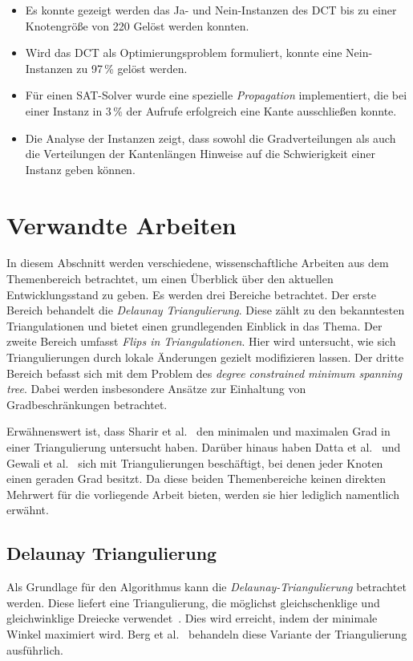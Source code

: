 \begin{itemize}
    \item Es konnte gezeigt werden das Ja- und Nein-Instanzen des DCT bis zu einer Knotengröße von 220 Gelöst werden konnten.
    \item Wird das DCT als Optimierungsproblem formuliert, konnte eine  Nein-Instanzen zu 97\,\% gelöst werden.
    \item Für einen SAT-Solver wurde eine spezielle \emph{Propagation} implementiert, die bei einer Instanz in 3\,\% der Aufrufe erfolgreich eine Kante ausschließen konnte.
    \item Die Analyse der Instanzen zeigt, dass sowohl die Gradverteilungen als auch die Verteilungen der Kantenlängen Hinweise auf die Schwierigkeit einer Instanz geben können.
\end{itemize}


\section{Verwandte Arbeiten}

In diesem Abschnitt werden verschiedene, wissenschaftliche Arbeiten aus dem Themenbereich betrachtet, um einen Überblick über den aktuellen Entwicklungsstand zu geben.
Es werden drei Bereiche betrachtet.
Der erste Bereich behandelt die \emph{Delaunay Triangulierung}.
Diese zählt zu den bekanntesten Triangulationen und bietet einen grundlegenden Einblick in das Thema.
Der zweite Bereich umfasst \emph{Flips in Triangulationen}.
Hier wird untersucht, wie sich Triangulierungen durch lokale Änderungen gezielt modifizieren lassen.
Der dritte Bereich befasst sich mit dem Problem des \emph{degree constrained minimum spanning tree}.
Dabei werden insbesondere Ansätze zur Einhaltung von Gradbeschränkungen betrachtet.

Erwähnenswert ist, dass Sharir et al.~\cite{On_degrees_in_random_triangulations_of_point_setss} den minimalen und maximalen Grad in einer Triangulierung untersucht haben.
Darüber hinaus haben Datta et al.~\cite{Degree_regular_triangulations_of_surfaces} und Gewali et al.~\cite{Degree_aware_triangulation_of_annular_regions} sich mit Triangulierungen beschäftigt, bei denen jeder Knoten einen geraden Grad besitzt.
Da diese beiden Themenbereiche keinen direkten Mehrwert für die vorliegende Arbeit bieten, werden sie hier lediglich namentlich erwähnt.

\subsection{Delaunay Triangulierung}
\label{sec:delaunay_triangulation}
Als Grundlage für den Algorithmus kann die \emph{Delaunay-Triangulierung} betrachtet werden.
Diese liefert eine Triangulierung, die möglichst gleichschenklige und gleichwinklige Dreiecke verwendet~\cite{Properties_of_the_Delaunay_triangulation}.
Dies wird erreicht, indem der minimale Winkel maximiert wird.
Berg et al.~\cite{Delaunay_Triangulation} behandeln diese Variante der Triangulierung ausführlich.

